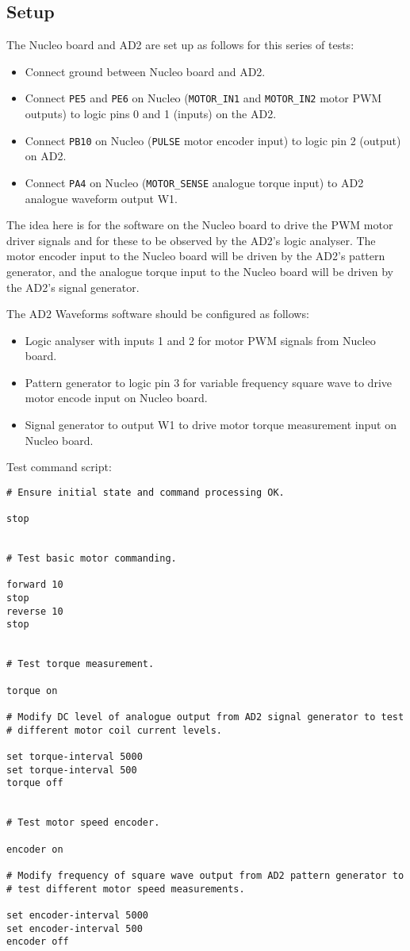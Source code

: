 \documentclass[a4paper,11pt]{article}
\begin{document}
\subsection*{Setup}

The Nucleo board and AD2 are set up as follows for this series of
tests:
\begin{itemize}
  \item{Connect ground between Nucleo board and AD2.}
  \item{Connect \texttt{PE5} and \texttt{PE6} on Nucleo
    (\texttt{MOTOR\_IN1} and \texttt{MOTOR\_IN2} motor PWM outputs) to
    logic pins 0 and 1 (inputs) on the AD2.}
  \item{Connect \texttt{PB10} on Nucleo (\texttt{PULSE} motor encoder
    input) to logic pin 2 (output) on AD2.}
  \item{Connect \texttt{PA4} on Nucleo (\texttt{MOTOR\_SENSE} analogue
    torque input) to AD2 analogue waveform output W1.}
\end{itemize}

The idea here is for the software on the Nucleo board to drive the PWM
motor driver signals and for these to be observed by the AD2's logic
analyser. The motor encoder input to the Nucleo board will be driven
by the AD2's pattern generator, and the analogue torque input to the
Nucleo board will be driven by the AD2's signal generator.

The AD2 Waveforms software should be configured as follows:
\begin{itemize}
  \item{Logic analyser with inputs 1 and 2 for motor PWM signals from
    Nucleo board.}
  \item{Pattern generator to logic pin 3 for variable frequency square
    wave to drive motor encode input on Nucleo board.}
  \item{Signal generator to output W1 to drive motor torque
    measurement input on Nucleo board.}
\end{itemize}

Test command script:
\begin{verbatim}
# Ensure initial state and command processing OK.

stop


# Test basic motor commanding.

forward 10
stop
reverse 10
stop


# Test torque measurement.

torque on

# Modify DC level of analogue output from AD2 signal generator to test
# different motor coil current levels.

set torque-interval 5000
set torque-interval 500
torque off


# Test motor speed encoder.

encoder on

# Modify frequency of square wave output from AD2 pattern generator to
# test different motor speed measurements.

set encoder-interval 5000
set encoder-interval 500
encoder off
\end{verbatim}
\end{document}
